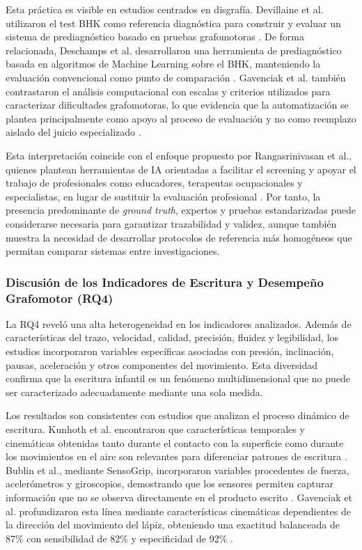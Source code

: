 \documentclass{iaesarticle}
\begin{document}
Esta práctica es visible en estudios centrados en disgrafía. Devillaine et al.
utilizaron el test BHK como referencia diagnóstica para construir y evaluar un
sistema de prediagnóstico basado en pruebas grafomotoras
\cite{Devillaine2021}. De forma relacionada, Deschamps et al. desarrollaron una
herramienta de prediagnóstico basada en algoritmos de Machine Learning sobre el
BHK, manteniendo la evaluación convencional como punto de comparación
\cite{Deschamps2021}. Gavenciak et al. también contrastaron el análisis
computacional con escalas y criterios utilizados para caracterizar
dificultades grafomotoras, lo que evidencia que la automatización se plantea
principalmente como apoyo al proceso de evaluación y no como reemplazo aislado
del juicio especializado \cite{Gavenciak2025}.

Esta interpretación coincide con el enfoque propuesto por Rangasrinivasan et
al., quienes plantean herramientas de IA orientadas a facilitar el screening y
apoyar el trabajo de profesionales como educadores, terapeutas ocupacionales y
especialistas, en lugar de sustituir la evaluación profesional
\cite{Rangasrinivasan2025}. Por tanto, la presencia predominante de
\textit{ground truth}, expertos y pruebas estandarizadas puede considerarse
necesaria para garantizar trazabilidad y validez, aunque también muestra la
necesidad de desarrollar protocolos de referencia más homogéneos que permitan
comparar sistemas entre investigaciones.

\subsubsection{Discusión de los Indicadores de Escritura y Desempeño Grafomotor (RQ4)}

La RQ4 reveló una alta heterogeneidad en los indicadores analizados. Además de
características del trazo, velocidad, calidad, precisión, fluidez y
legibilidad, los estudios incorporaron variables específicas asociadas con
presión, inclinación, pausas, aceleración y otros componentes del movimiento.
Esta diversidad confirma que la escritura infantil es un fenómeno
multidimensional que no puede ser caracterizado adecuadamente mediante una sola
medida.

Los resultados son consistentes con estudios que analizan el proceso dinámico
de escritura. Kunhoth et al. encontraron que características temporales y
cinemáticas obtenidas tanto durante el contacto con la superficie como durante
los movimientos en el aire son relevantes para diferenciar patrones de
escritura \cite{Kunhoth2023b}. Bublin et al., mediante SensoGrip, incorporaron
variables procedentes de fuerza, acelerómetros y giroscopios, demostrando que
los sensores permiten capturar información que no se observa directamente en
el producto escrito \cite{Bublin2023}. Gavenciak et al. profundizaron esta
línea mediante características cinemáticas dependientes de la dirección del
movimiento del lápiz, obteniendo una exactitud balanceada de 87\% con
sensibilidad de 82\% y especificidad de 92\% \cite{Gavenciak2025}.
\end{document}
